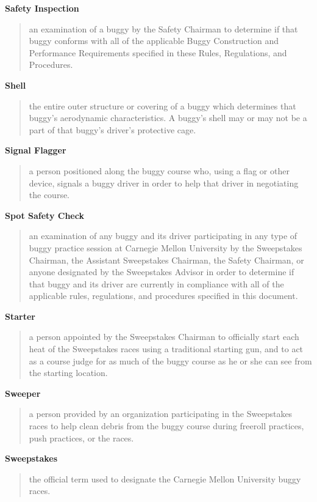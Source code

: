 \textbf{Safety Inspection}
\begin{quote}
	an examination of a buggy by the Safety Chairman to determine if that buggy conforms with all of the applicable Buggy Construction and Performance Requirements specified in these Rules, Regulations, and Procedures.
\end{quote}

\textbf{Shell}
\begin{quote}
	the entire outer structure or covering of a buggy which determines that buggy's aerodynamic characteristics. A buggy's shell may or may not be a part of that buggy's driver's protective cage.
\end{quote}

\textbf{Signal Flagger}
\begin{quote}
	a person positioned along the buggy course who, using a flag or other device, signals a buggy driver in order to help that driver in negotiating the course.
\end{quote}

\textbf{Spot Safety Check}
\begin{quote}
	an examination of any buggy and its driver participating in any type of buggy practice session at Carnegie Mellon University by the Sweepstakes Chairman, the Assistant Sweepstakes Chairman, the Safety Chairman, or anyone designated by the Sweepstakes Advisor in order to determine if that buggy and its driver are currently in compliance with all of the applicable rules, regulations, and procedures specified in this document.
\end{quote}

\textbf{Starter}
\begin{quote}
	a person appointed by the Sweepstakes Chairman to officially start each heat of the Sweepstakes races using a traditional starting gun, and to act as a course judge for as much of the buggy course as he or she can see from the starting location.
\end{quote}

\textbf{Sweeper}
\begin{quote}
	a person provided by an organization participating in the Sweepstakes races to help clean debris from the buggy course during freeroll practices, push practices, or the races.
\end{quote}

\textbf{Sweepstakes}
\begin{quote}
	the official term used to designate the Carnegie Mellon University buggy races.
\end{quote}


